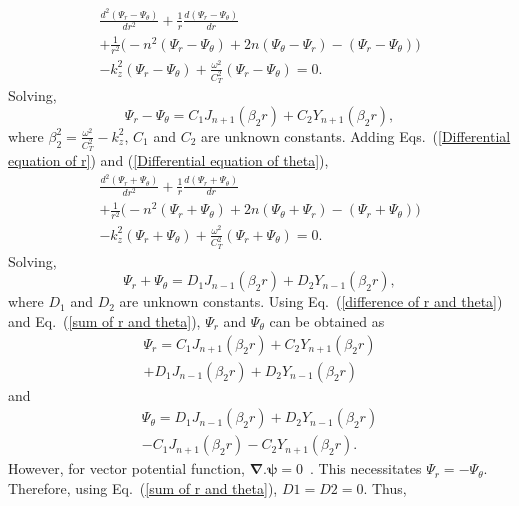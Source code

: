 \documentclass[twocolumn,10pt]{asme2ej}
\begin{document}
\begin{multline}
    \frac{d^{2}(\Psi_{r}-\Psi_\theta)}{dr^{2}} + \frac{1}{r}\frac{d(\Psi_{r}-\Psi_\theta)}{dr}\\ + \frac{1}{r^{2}}\bigg(-n^{2}(\Psi_{r}-\Psi_\theta )+ 2n(\Psi_{\theta}-\Psi_r)-(\Psi_{r}-\Psi_\theta)\bigg)\\ - k_{z}^{2}(\Psi_{r}-\Psi_\theta) + \frac{\omega^{2}}{C_{T}^{2}}(\Psi_{r}-\Psi_\theta) = 0.
\end{multline}
Solving,
\begin{equation}\label{difference of r and theta}
    \Psi_{r} -\Psi_{\theta} = C_{1}J_{n+1}(\beta_2 r) + C_{2}Y_{n+1}(\beta_2 r),
\end{equation}
where $\beta_2^{2} = \frac{\omega^{2}}{C_{T}^{2}} - k_z^{2}$, $C_1$ and $C_2$ are unknown constants.
Adding Eqs.~(\ref{Differential equation of r}) and (\ref{Differential equation of theta}),
\begin{multline}
    \frac{d^{2}(\Psi_{r}+\Psi_\theta)}{dr^{2}} + \frac{1}{r}\frac{d(\Psi_{r}+\Psi_\theta)}{dr}\\ + \frac{1}{r^{2}}\bigg(-n^{2}(\Psi_{r}+\Psi_\theta )+ 2n(\Psi_{\theta}+\Psi_r)-(\Psi_{r}+\Psi_\theta)\bigg)\\ - k_{z}^{2}(\Psi_{r}+\Psi_\theta) + \frac{\omega^{2}}{C_{T}^{2}}(\Psi_{r}+\Psi_\theta) = 0.
\end{multline}
Solving,
\begin{equation}\label{sum of r and theta}
    \Psi_{r} + \Psi_{\theta} = D_{1}J_{n-1}(\beta_2 r) + D_{2}Y_{n-1}(\beta_2 r),
\end{equation}
where $D_1$ and $D_2$ are unknown constants. Using Eq.~(\ref{difference of r and theta}) and Eq.~(\ref{sum of r and theta}), $\Psi_{r}$ and $\Psi_{\theta}$ can be obtained as
\begin{multline}\label{simplified eqn vector r}
    \Psi_{r} = C_{1}J_{n+1}(\beta_2 r) + C_{2}Y_{n+1}(\beta_2 r)\\ + D_{1}J_{n-1}(\beta_2 r) + D_{2}Y_{n-1}(\beta_2 r) 
\end{multline}
and
\begin{multline}\label{simplified eqn vector theta}
    \Psi_{\theta} = D_{1}J_{n-1}(\beta_2 r) + D_{2}Y_{n-1}(\beta_2 r)\\- C_{1}J_{n+1}(\beta_2 r) - C_{2}Y_{n+1}(\beta_2 r).
\end{multline}
However, for vector potential function, $\pmb{\nabla}.\pmb{\psi} = 0$~\cite{achenbach2012}. This necessitates  $\Psi_{r} = -\Psi_{\theta}$. Therefore, using Eq.~(\ref{sum of r and theta}), $D1 = D2 = 0$. Thus,
\end{document}
